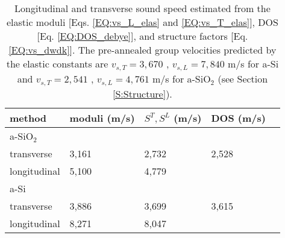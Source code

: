 \documentclass[aps,prb,twocolumn,superscriptaddress,footinbib,amsmath,amssymb,floatfix]{revtex4}
\begin{document}


\begin{center}
\begingroup
\begin{table}
\caption{\label{T:vs}
Longitudinal and transverse sound speed estimated from the elastic 
moduli [Eqs. \eqref{EQ:vs_L_elas} and \eqref{EQ:vs_T_elas}], 
DOS [Eq. \eqref{EQ:DOS_debye}], 
and structure factors [Eq. \eqref{EQ:vs_dwdk}]. 
The pre-annealed group velocities predicted by the elastic constants are 
$v_{s,T} = 3,670$ , $v_{s,L} = 7,840$ m/s for a-Si and
$v_{s,T} = 2,541$ , $v_{s,L} = 4,761 $ m/s for a-SiO$_2$ 
(see Section \ref{S:Structure}).
}
\begin{tabular}{lllll}
\hline
method & moduli (m/s) & $S^{T}, S^{L}$ (m/s) 
& DOS (m/s) & \\
\hline
a-SiO$_2$  \\
\hline
transverse & 3,161 & 2,732 & 2,528 &  \\
\hline
longitudinal & 5,100 &  4,779 & & \\
\hline
a-Si  \\
\hline
transverse & 3,886 & 3,699 & 3,615 & \\
\hline
longitudinal & 8,271 & 8,047 & &    \\
\hline
\end{tabular}
\end{table}
\endgroup
\end{center}
\end{document}
